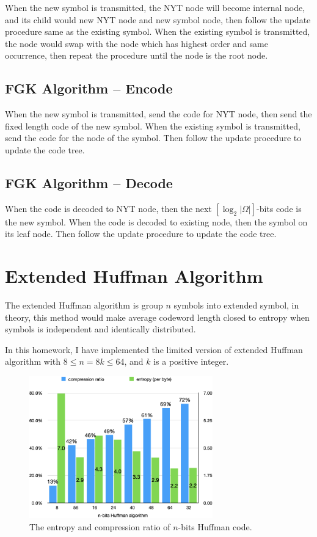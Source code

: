 \documentclass[a4paper,conference]{IEEEtran}
\begin{document}
When the new symbol is transmitted, the NYT node will become internal node, and its child would new NYT node and new symbol node, then follow the update procedure same as the existing symbol.
When the existing symbol is transmitted, the node would swap with the node which has highest order and same occurrence, then repeat the procedure until the node is the root node.

\subsection{FGK Algorithm -- Encode}

When the new symbol is transmitted, send the code for NYT node, then send the fixed length code of the new symbol. When the existing symbol is transmitted, send the code for the node of the symbol. Then follow the update procedure to update the code tree.

\subsection{FGK Algorithm -- Decode}

When the code is decoded to NYT node, then the next $[ \log_2{|\Omega|} ]$-bits code is the new symbol. When the code is decoded to existing node, then the symbol on its leaf node. Then follow the update procedure to update the code tree.

\section{Extended Huffman Algorithm}

The extended Huffman algorithm is group $n$ symbols into extended symbol, in theory, this method would make average codeword length closed to entropy when symbols is independent and identically distributed.

In this homework, I have implemented the limited version of extended Huffman algorithm with $8 \le n = 8k \le 64$, and $k$ is a positive integer.


\begin{figure}[htbp]
\centerline{\includegraphics[height=6.15cm, keepaspectratio,]{assets/chart-entropy-compression-ratio-asc.png}}
\caption{The entropy and compression ratio of $n$-bits Huffman code.}
\label{fig-chart-entropy-compression-ratio}
\end{figure}
\end{document}

